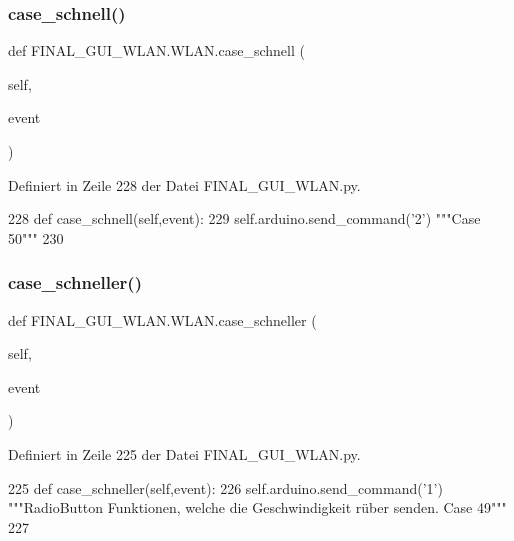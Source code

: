 \subsubsection{\texorpdfstring{case\+\_\+schnell()}{case\_schnell()}}
{\footnotesize\ttfamily def F\+I\+N\+A\+L\+\_\+\+G\+U\+I\+\_\+\+W\+L\+A\+N.\+W\+L\+A\+N.\+case\+\_\+schnell (\begin{DoxyParamCaption}\item[{}]{self,  }\item[{}]{event }\end{DoxyParamCaption})}



Definiert in Zeile 228 der Datei F\+I\+N\+A\+L\+\_\+\+G\+U\+I\+\_\+\+W\+L\+A\+N.\+py.


\begin{DoxyCode}
228     \textcolor{keyword}{def }case\_schnell(self,event):
229         self.arduino.send\_command(\textcolor{stringliteral}{'2'})  \textcolor{stringliteral}{"""Case 50"""}
230 
\end{DoxyCode}
\mbox{\label{class_f_i_n_a_l___g_u_i___w_l_a_n_1_1_w_l_a_n_aaeaf91e8d510f91d1830a4b428354de8}} 
\subsubsection{\texorpdfstring{case\+\_\+schneller()}{case\_schneller()}}
{\footnotesize\ttfamily def F\+I\+N\+A\+L\+\_\+\+G\+U\+I\+\_\+\+W\+L\+A\+N.\+W\+L\+A\+N.\+case\+\_\+schneller (\begin{DoxyParamCaption}\item[{}]{self,  }\item[{}]{event }\end{DoxyParamCaption})}



Definiert in Zeile 225 der Datei F\+I\+N\+A\+L\+\_\+\+G\+U\+I\+\_\+\+W\+L\+A\+N.\+py.


\begin{DoxyCode}
225     \textcolor{keyword}{def }case\_schneller(self,event):
226         self.arduino.send\_command(\textcolor{stringliteral}{'1'})  \textcolor{stringliteral}{"""RadioButton Funktionen, welche die Geschwindigkeit rüber senden.
       Case 49"""}
227 
\end{DoxyCode}
\mbox{\label{class_f_i_n_a_l___g_u_i___w_l_a_n_1_1_w_l_a_n_a0727b5c8ed1339b9c3a5bc7c290a9502}} 

